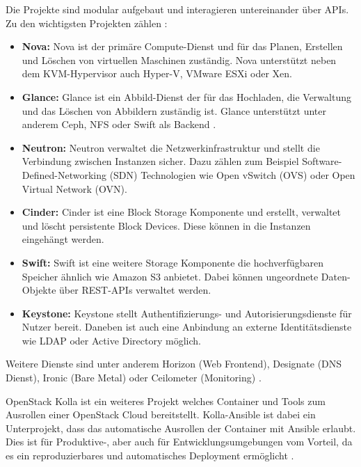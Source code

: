 \documentclass[../Main.tex]{subfiles}
\begin{document}
Die Projekte sind modular aufgebaut und interagieren untereinander über APIs. Zu den wichtigsten Projekten zählen \citep{WhatIsOpenStack}:
\begin{itemize}
    \item[] \textbf{Nova:} Nova ist der primäre Compute-Dienst und für das Planen, Erstellen und Löschen von virtuellen Maschinen zuständig. Nova unterstützt neben dem KVM-Hypervisor auch Hyper-V, VMware ESXi oder Xen.
    \item[] \textbf{Glance:} Glance ist ein Abbild-Dienst der für das Hochladen, die Verwaltung und das Löschen von Abbildern zuständig ist. Glance unterstützt unter anderem Ceph, NFS oder Swift als Backend \citep{OpenStackGlanceStores}.
    \item[] \textbf{Neutron:} Neutron verwaltet die Netzwerkinfrastruktur und stellt die Verbindung zwischen Instanzen sicher. Dazu zählen zum Beispiel Software-Defined-Networking (SDN) Technologien wie Open vSwitch (OVS) oder Open Virtual Network (OVN).
    \item[] \textbf{Cinder:} Cinder ist eine Block Storage Komponente und erstellt, verwaltet und löscht persistente Block Devices. Diese können in die Instanzen eingehängt werden.
    \item[] \textbf{Swift:} Swift ist eine weitere Storage Komponente die hochverfügbaren Speicher ähnlich wie Amazon S3 anbietet. Dabei können ungeordnete Daten-Objekte über REST-APIs verwaltet werden.
    \item[] \textbf{Keystone:} Keystone stellt Authentifizierungs- und Autorisierungsdienste für Nutzer bereit. Daneben ist auch eine Anbindung an externe Identitätsdienste wie LDAP oder Active Directory möglich.
\end{itemize}

Weitere Dienste sind unter anderem Horizon (Web Frontend), Designate (DNS Dienst), Ironic (Bare Metal) oder Ceilometer (Monitoring) \citep{OpenStackProjects}.

OpenStack Kolla ist ein weiteres Projekt welches Container und Tools zum Ausrollen einer OpenStack Cloud bereitstellt. Kolla-Ansible ist dabei ein Unterprojekt, dass das
automatische Ausrollen der Container mit Ansible erlaubt. Dies ist für Produktive-, aber auch für Entwicklungsumgebungen vom Vorteil, da es ein reproduzierbares und automatisches Deployment ermöglicht \citep{OpenStackKolla}.
\end{document}
